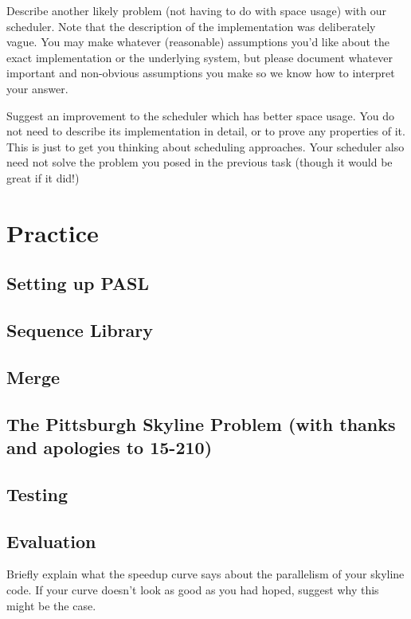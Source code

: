 \documentclass{article}
\begin{document}
\begin{task} 
Describe another likely problem (not having to do with space usage)
with our scheduler. Note that the description of the implementation was
deliberately vague. You may make whatever (reasonable) assumptions you'd like
about the exact implementation or the underlying system, but please document
whatever important and non-obvious assumptions you make so we know how
to interpret your answer.
\end{task}
\begin{sol}
\end{sol}

\begin{task} 
Suggest an improvement to the scheduler which has better space usage. You do not
need to describe its implementation in detail, or to prove any properties of
it. This is just to get you thinking about scheduling approaches. Your scheduler
also need not solve the problem you posed in the previous task (though it would
be great if it did!)
\end{task}
\begin{sol}
\end{sol}

\section{Practice}
\subsection{Setting up PASL}
\subsection{Sequence Library}
\subsection{Merge}
\subsection{The Pittsburgh Skyline Problem (with thanks and apologies to 15-210)}
\subsection{Testing}
\subsection{Evaluation}
\begin{task} 
Briefly explain what the speedup curve says about the parallelism of your
skyline code. If your curve doesn't look as good as you had hoped, suggest
why this might be the case.
\end{task}
\begin{sol}
\end{sol}
\end{document}
